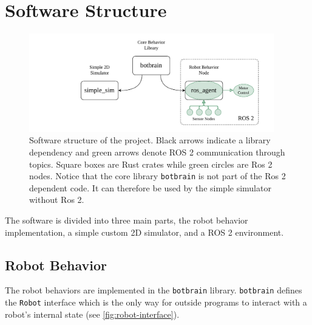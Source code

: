 \section{Software Structure}

\begin{figure}
    \begin{center}
        \includegraphics[width=0.95\textwidth]{figures/software-structure.pdf}
    \end{center}
    \caption{Software structure of the project. Black arrows indicate a library dependency and green arrows denote ROS 2 communication through topics. Square boxes are Rust crates while green circles are Ros 2 nodes. Notice that the core library \texttt{botbrain} is not part of the Ros 2 dependent code. It can therefore be used by the simple simulator without Ros 2.}\label{fig:}
\end{figure}


The software is divided into three main parts, the robot behavior implementation, a simple custom 2D
simulator, and a ROS 2 environment.

\subsection{Robot Behavior}
The robot behaviors are implemented in the \texttt{botbrain} library. \texttt{botbrain} defines the \texttt{Robot} interface
which is the only way for outside programs to interact with a robot’s internal state (see \cref{fig:robot-interface}).

